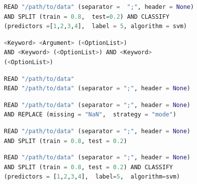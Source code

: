 \clearpage


\begin{lstlisting}[language=python,  caption={Example of a SML Query Performing Classification.}, label={lst:sml-ex-1}]
READ "/path/to/data" (separator =  ";", header = None) 
AND SPLIT (train = 0.8,  test=0.2) AND CLASSIFY 
(predictors =[1,2,3,4],  label = 5, algorithm = svm) 
\end{lstlisting}


\begin{lstlisting}[language=python,  caption={Here the example \(Query\) in listing \ref{lst:sml-ex-1} is defined in BNF format.}, label={lst:SML:BNFComp}]
<Keyword> <Argument> (<OptionList>) 
AND <Keyword> (<OptionList>) AND <Keyword>
(<OptionList>) 
\end{lstlisting}

\begin{lstlisting}[language=python,  caption={Examples using the \(READ\) \(Keyword\) in SML.}, label={lst:SML:READ}]
READ "/path/to/data" 
READ "/path/to/data" (separator = ";", header = None) 
\end{lstlisting}


\begin{lstlisting}[language=python,  caption={An example utilizing the \(REPLACE\) \(Keyword\) in SML.}, label={lst:SML:REPLACE}]
READ "/path/to/data" (separator = ";", header = None) 
AND REPLACE (missing = "NaN",  strategy = "mode")
\end{lstlisting}

\begin{lstlisting}[language=python,  caption={Example using the \(SPLIT\) \(Keyword\) in SML.}, label={lst:SML:SPLIT}]
READ "/path/to/data" (separator = ";", header = None) 
AND SPLIT (train = 0.8, test = 0.2)
\end{lstlisting}

\begin{lstlisting}[language=python,  caption={Example using the \(CLASSIFY\) \(Keyword\) in SML.  Here we read in data and create training and testing datasets using the \(READ\) and \(SPLIT\) \(Keyword\)s respectively. We then use \(CLASSIFY\) \(Keyword\) with the first four columns as features and the fifth column to perform classification using a support vector machine.}, label={lst:SML:CLASSIFY}]
READ "/path/to/data" (separator = ";", header = None) 
AND SPLIT (train = 0.8, test = 0.2) AND CLASSIFY
(predictors = [1,2,3,4],  label=5,  algorithm=svm)
\end{lstlisting}


